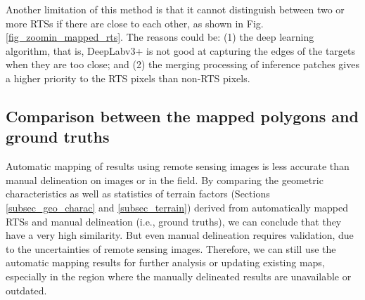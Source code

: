 \documentclass[authoryear,preprint,review,12pt]{elsarticle}
\begin{document}


Another limitation of this method is that it cannot distinguish between two or more RTSs if there are close to each other, as shown in Fig. \ref{fig_zoomin_mapped_rts}. %
The reasons could be: (1) the deep learning algorithm, that is, DeepLabv3+ is not good at capturing the edges of the targets when they are too close; and (2) the merging processing of inference patches gives a higher priority to the RTS pixels than non-RTS pixels.

\subsection{Comparison between the mapped polygons and ground truths}
\label{subsec_potential_largeArea}



Automatic mapping of results using remote sensing images is less accurate than manual delineation on images or in the field. 
By comparing the geometric characteristics as well as statistics of terrain factors (Sections \ref{subsec_geo_charac} and \ref{subsec_terrain}) derived from automatically mapped RTSs and manual delineation (i.e., ground truths), we can conclude that they have a very high similarity. 
But even manual delineation requires validation, due to the uncertainties of remote sensing images.  
Therefore, we can still use the automatic mapping results for further analysis or updating existing maps, especially in the region where the manually delineated results are unavailable or outdated. 
\end{document}
